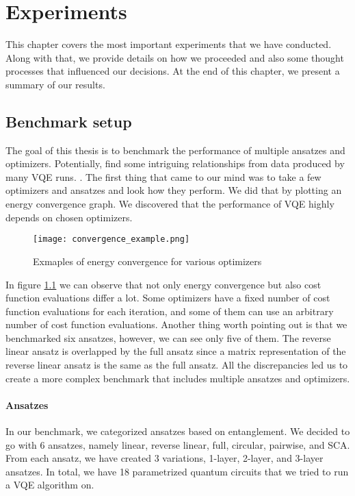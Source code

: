 \chapter{Experiments}\label{ch:experiments}
This chapter covers the most important experiments that we have conducted. Along with that, we provide details on how we proceeded and also some thought processes that influenced our decisions. At the end of this chapter, we present a summary of our results.

\section{Benchmark setup}
The goal of this thesis is to benchmark the performance of multiple ansatzes and optimizers. Potentially, find some intriguing relationships from data produced by many VQE runs. . The first thing that came to our mind was to take a few optimizers and ansatzes and look how they perform. We did that by plotting an energy convergence graph. We discovered that the performance of VQE highly depends on chosen optimizers. 

\begin{figure}
    \centering
    \texttt{[image: convergence\_example.png]}
    \caption{Exmaples of energy convergence for various optimizers}
    \label{fig:energy-convergence}
\end{figure}

In figure \ref{fig:energy-convergence} we can observe that not only energy convergence but also cost function evaluations differ a lot. Some optimizers have a fixed number of cost function evaluations for each iteration, and some of them can use an arbitrary number of cost function evaluations.  Another thing worth pointing out is that we benchmarked six ansatzes, however, we can see only five of them. The reverse linear ansatz is overlapped by the full ansatz since a matrix representation of the reverse linear ansatz is the same as the full ansatz. All the discrepancies led us to create a more complex benchmark that includes multiple ansatzes and optimizers.

\subsubsection{Ansatzes}
In our benchmark, we categorized ansatzes based on entanglement. We decided to go with 6 ansatzes, namely linear, reverse linear, full, circular, pairwise, and SCA. From each ansatz, we have created 3 variations, 1-layer, 2-layer, and 3-layer ansatzes. In total, we have 18 parametrized quantum circuits that we tried to run a VQE algorithm on.

